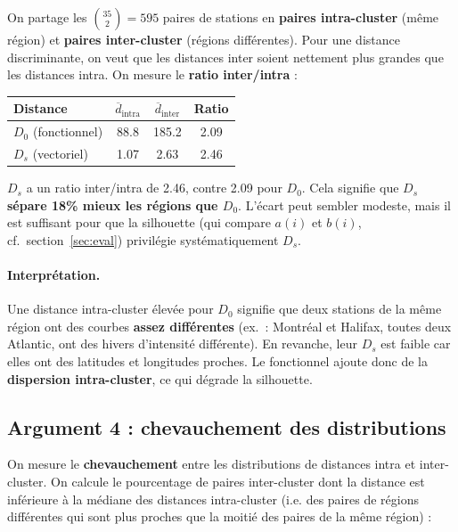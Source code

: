 \documentclass[11pt, a4paper]{article}
\theoremstyle{definition}
\theoremstyle{remark}
\begin{document}
On partage les $\binom{35}{2} = 595$ paires de stations en
\textbf{paires intra-cluster} (même région) et \textbf{paires inter-cluster}
(régions différentes). Pour une distance discriminante, on veut que les
distances inter soient nettement plus grandes que les distances intra. On
mesure le \textbf{ratio inter/intra} :

\begin{center}
\begin{tabular}{lccc}
  \toprule
  \textbf{Distance} & $\overline{d}_{\text{intra}}$ & $\overline{d}_{\text{inter}}$ & \textbf{Ratio} \\
  \midrule
  $D_0$ (fonctionnel) & 88.8  & 185.2 & 2.09 \\
  $D_s$ (vectoriel)   & 1.07  & 2.63  & 2.46 \\
  \bottomrule
\end{tabular}
\end{center}

$D_s$ a un ratio inter/intra de 2.46, contre 2.09 pour $D_0$. Cela signifie
que \textbf{$D_s$ sépare 18\% mieux les régions que $D_0$}. L'écart peut
sembler modeste, mais il est suffisant pour que la silhouette
(qui compare $a(i)$ et $b(i)$, cf.~section~\ref{sec:eval}) privilégie
systématiquement $D_s$.

\paragraph{Interprétation.} Une distance intra-cluster élevée pour $D_0$
signifie que deux stations de la même région ont des courbes
\textbf{assez différentes} (ex.~: Montréal et Halifax, toutes deux Atlantic,
ont des hivers d'intensité différente). En revanche, leur $D_s$ est faible
car elles ont des latitudes et longitudes proches. Le fonctionnel ajoute donc
de la \textbf{dispersion intra-cluster}, ce qui dégrade la silhouette.

\subsection{Argument 4 : chevauchement des distributions}

On mesure le \textbf{chevauchement} entre les distributions de distances intra
et inter-cluster. On calcule le pourcentage de paires inter-cluster dont la
distance est inférieure à la médiane des distances intra-cluster (i.e.
des paires de régions différentes qui sont plus proches que la moitié des
paires de la même région) :
\end{document}
